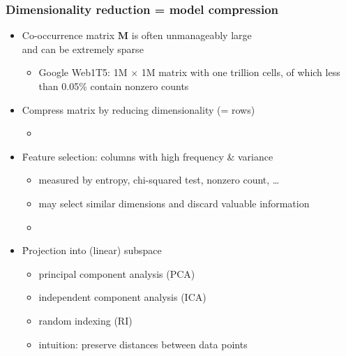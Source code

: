 \documentclass[t]{beamer} %
\begin{document}

\begin{frame}
  \frametitle{Dimensionality reduction = model compression}

  \begin{itemize}
  \item Co-occurrence matrix $\mathbf{M}$ is often unmanageably large\\
    and can be extremely sparse
    \begin{itemize}
    \item Google Web1T5: 1M $\times$ 1M matrix with one trillion
      cells, of which less than 0.05\% contain nonzero counts \citep{Evert:10a}
    \end{itemize}
  \item[\So] Compress matrix by reducing dimensionality (= rows)
    \begin{itemize}
    \item[]\pause
    \end{itemize}
  \item \h{Feature selection}: columns with high frequency \& variance
    \begin{itemize}
    \item measured by entropy, chi-squared test, nonzero count, \ldots
    \item may select similar dimensions and discard valuable information
    \item[]
    \end{itemize}
    \pause
  \item \h{Projection} into (linear) subspace
    \begin{itemize}
    \item principal component analysis (PCA)
    \item independent component analysis (ICA)
    \item random indexing (RI)
    \item[\hand] intuition: preserve distances between data points
    \end{itemize}
  \end{itemize}
\end{frame}
\end{document}
